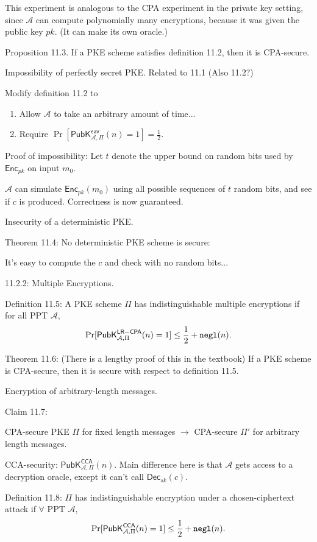 \documentclass[12pt]{article}
\newcommand{\AAA}{\mathcal{A}}
\newcommand{\Enc}{\mathsf{Enc}}
\newcommand{\Dec}{\mathsf{Dec}}
\newcommand{\ExptPubEavArgs}[2]{\mathsf{PubK}^{\mathsf{eav}}_{#1,#2}}
\newcommand{\ExptPubCpaArgs}[2]{\mathsf{PubK}^{\mathsf{LR-CPA}}_{#1,#2}}
\newcommand{\ExptPubCcaArgs}[2]{\mathsf{PubK}^{\mathsf{CCA}}_{#1,#2}}
\newcommand{\ExptPubEav}{\ExptPubEavArgs{\AAA}{\Pi}}
\newcommand{\ExptPubCpa}{\ExptPubCpaArgs{\AAA}{\Pi}}
\newcommand{\ExptPubCca}{\ExptPubCcaArgs{\AAA}{\Pi}}
\newcommand{\negl}{{\tt negl}}
\begin{document}
This experiment is analogous to the CPA experiment in the private key setting, since $\AAA$ can compute polynomially many encryptions, because it was given the public key $pk$. (It can make its own oracle.)

Proposition 11.3. If a PKE scheme satisfies definition 11.2, then it is CPA-secure.

Impossibility of perfectly secret PKE. Related to 11.1 (Also 11.2?)

Modify definition 11.2 to \begin{enumerate}

\item Allow $\AAA$ to take an arbitrary amount of time...

\item Require $\Pr[\ExptPubEav(n)=1]=\frac{1}{2}$.

\end{enumerate}

Proof of impossibility: Let $t$ denote the upper bound on random bits used by $\Enc_{pk}$ on input $m_0$.

$\AAA$ can  simulate $\Enc_{pk}(m_0)$ using all possible sequences of $t$ random bits, and see if $c$ is produced. Correctness is now guaranteed.

Insecurity of a deterministic PKE.

Theorem 11.4: No deterministic PKE scheme is secure:

It's easy to compute the $c$ and check with no random bits...

11.2.2: Multiple Encryptions.

Definition 11.5: A PKE scheme $\Pi$ has indistinguishable multiple encryptions if for all PPT $\AAA$, $$\Pr[\ExptPubCpa(n)=1]\leq\frac{1}{2}+\negl(n).$$

Theorem 11.6: (There is a lengthy proof of this in the textbook) If a PKE scheme is CPA-secure, then it is secure with respect to definition 11.5.

Encryption of arbitrary-length messages.

Claim 11.7:

CPA-secure PKE $\Pi$ for fixed length messages $\to$ CPA-secure $\Pi'$ for arbitrary length messages.

CCA-security: $\ExptPubCca(n)$. Main difference here is that $\AAA$ gets access to a decryption oracle, except it can't call $\Dec_{sk}(c)$.

Definition 11.8: $\Pi$ has indistinguishable encryption under a chosen-ciphertext attack if $\forall$ PPT $\AAA$, $$\Pr[\ExptPubCca(n)=1]\leq\frac{1}{2}+\negl(n).$$
\end{document}
